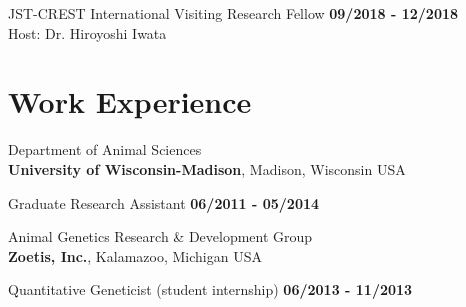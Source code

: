\documentclass[margin,line,10pt]{res}
\begin{document}
\begin{resume}
JST-CREST International Visiting Research Fellow  \hfill {\bf 09/2018 - 12/2018}\\
Host: Dr. Hiroyoshi Iwata


  


\vspace{0.4cm}
\section{\sc Work \phantom{1cm} Experience}
Department of Animal Sciences\\
{\bf University of Wisconsin-Madison}, Madison, Wisconsin USA


\vspace{-.4cm}

Graduate Research Assistant   \hfill {\bf 06/2011 - 05/2014}\\
\vspace{-.4cm}

Animal Genetics Research \& Development  Group \\
{\bf Zoetis, Inc.}, Kalamazoo, Michigan USA

\vspace{-.4cm}

Quantitative Geneticist (student internship)   \hfill {\bf 06/2013 - 11/2013}\\








\vspace{0.5cm}

\end{resume}
\end{document}
